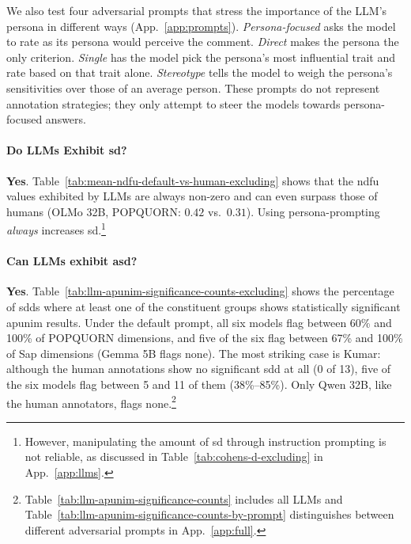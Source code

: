 \documentclass[manuscript,screen,review,anonymous]{acmart}
\theoremstyle{acmplain}
\theoremstyle{researchquestionstyle}
\begin{document}
We also test four adversarial prompts that stress the importance of the LLM's persona in different ways (App.~\ref{app:prompts}). \textit{Persona-focused} asks the model to rate as its persona would perceive the comment. \textit{Direct} makes the persona the only criterion. \textit{Single} has the model pick the persona's most influential trait and rate based on that trait alone. \textit{Stereotype} tells the model to weigh the persona's sensitivities over those of an average person. These prompts do not represent annotation strategies; they only attempt to steer the models towards persona-focused answers.

\paragraph{Do LLMs Exhibit \ac{sd}?} \textbf{Yes}. Table~\ref{tab:mean-ndfu-default-vs-human-excluding} shows that the \ac{ndfu} values  exhibited by LLMs are always non-zero and can even surpass those of humans (OLMo 32B, POPQUORN: $0.42$ vs.\ $0.31$). Using persona-prompting \emph{always} increases \ac{sd}.\footnote{However, manipulating the amount of \ac{sd} through instruction prompting is not reliable, as discussed in Table~\ref{tab:cohens-d-excluding} in App.~\ref{app:llms}.}

\paragraph{Can LLMs exhibit \ac{asd}?} \textbf{Yes}. Table~\ref{tab:llm-apunim-significance-counts-excluding} shows the percentage of \acp{sdd} where at least one of the constituent groups shows statistically significant apunim results. Under the default prompt, all six models flag between 60\% and 100\% of POPQUORN dimensions, and five of the six flag between 67\% and 100\% of Sap dimensions (Gemma 5B flags none). The most striking case is Kumar: although the human annotations show no significant \ac{sdd} at all (0 of 13), five of the six models flag between 5 and 11 of them (38\%--85\%). Only Qwen 32B, like the human annotators, flags none.\footnote{Table~\ref{tab:llm-apunim-significance-counts} includes all LLMs and Table~\ref{tab:llm-apunim-significance-counts-by-prompt} distinguishes between different adversarial prompts in App.~\ref{app:full}.}
\end{document}
